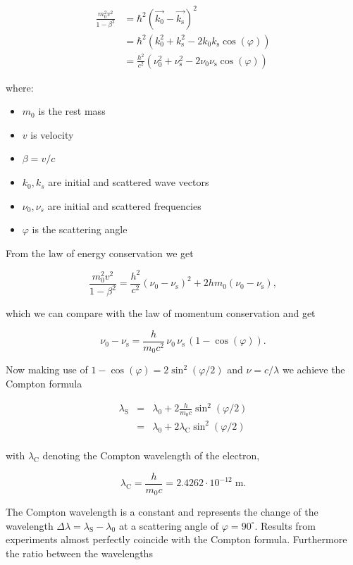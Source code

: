 \documentclass[
  a4paper,
]{book}
\providecommand{\tightlist}{%
  \setlength{\itemsep}{0pt}\setlength{\parskip}{0pt}}
\begin{document}
\[
\begin{aligned}
\frac{m_0^2 v^2}{1-\beta^2} &= \hbar^2 (\vec{k_0} - \vec{k_{\mathrm{s}}})^2 \\
&= \hbar^2(k_0^2 + k_{\mathrm{s}}^2 - 2k_0k_{\mathrm{s}}\cos(\varphi)) \\
&= \frac{h^2}{c^2}(\nu_0^2 + \nu_{\mathrm{s}}^2 - 2\nu_0\nu_{\mathrm{s}}\cos(\varphi))
\end{aligned}
\]

where:

\begin{itemize}
\tightlist
\item
  \(m_0\) is the rest mass
\item
  \(v\) is velocity
\item
  \(\beta = v/c\)
\item
  \(k_0, k_s\) are initial and scattered wave vectors
\item
  \(\nu_0, \nu_s\) are initial and scattered frequencies
\item
  \(\varphi\) is the scattering angle
\end{itemize}

From the law of energy conservation we get

\[
\frac{m_0^2 v^2}{1-\beta^2} = \frac{h^2}{c^2} \left( \nu_0 - \nu_{\mathrm{s}} \right)^2 + 2 h m_0 \left( \nu_0 - \nu_{\mathrm{s}}\right) \mathrm{,}
\]

which we can compare with the law of momentum conservation and get

\[
 \nu_0 - \nu_{\mathrm{s}} = \frac{h}{m_0 c^2} \,  \nu_0 \, \nu_{\mathrm{s}} \, \left(1- \cos \left( \varphi \right) \right) \mathrm{.}
\]

Now making use of
\(1- \cos \left( \varphi \right) = 2 \sin^2 \left( \varphi/2 \right)\)
and \(\nu = c/\lambda\) we achieve the Compton formula

\[
\begin{aligned}
\lambda_{\mathrm{S}} & = & \lambda_0 + 2 \frac{h}{m_0 c} \sin^2 \left( \varphi/2 \right)\\
{} & = & \lambda_0 + 2 \lambda_{\mathrm{C}} \sin^2 \left( \varphi/2 \right)\\
\end{aligned}
\]

with \(\lambda_{\mathrm{C}}\) denoting the Compton wavelength of the
electron,

\[
\lambda_{\mathrm{C}} = \frac{h}{m_0 c} = 2.4262 \cdot 10^{-12} \; \mathrm{m.}
\]

The Compton wavelength is a constant and represents the change of the
wavelength \(\Delta \lambda = \lambda_{\mathrm{S}} - \lambda_0\) at a
scattering angle of \(\varphi = 90^{\circ}\). Results from experiments
almost perfectly coincide with the Compton formula. Furthermore the
ratio between the wavelengths
\end{document}
